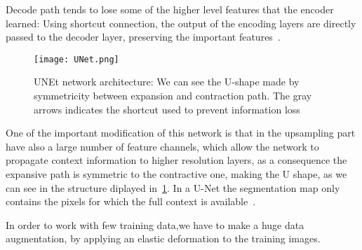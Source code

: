 \documentclass{standalone}
\begin{document}
		Decode path tends to lose some of the higher level features that the encoder learned: Using shortcut connection, the output of the encoding layers are directly passed to the decoder layer, preserving the important features~\cite{PhDtheis}.
	
		
		\begin{figure}[h!]
			\centering
				\texttt{[image: UNet.png]}
					\caption{UNEt network architecture: We can see the U-shape made by symmetricity between expansion and contraction path. The gray arrows indicates the shortcut used to prevent information loss}\label{fig:UNet}
		\end{figure}
	
		One of the important modification of this network is that in the upsampling part  have also a large number of feature channels, which allow the network to propagate context information to higher resolution layers, as a consequence the expansive path is symmetric to the contractive one, making the U shape, as we can see in the structure diplayed in \figurename\,\ref{fig:UNet}. In a U-Net the segmentation map only contains the pixels for which the full context is available~\cite{ART:Johannes}.
		
		
		In order to work with few training data,we have to make a huge data augmentation, by applying an elastic deformation to the training images.
\end{document}
